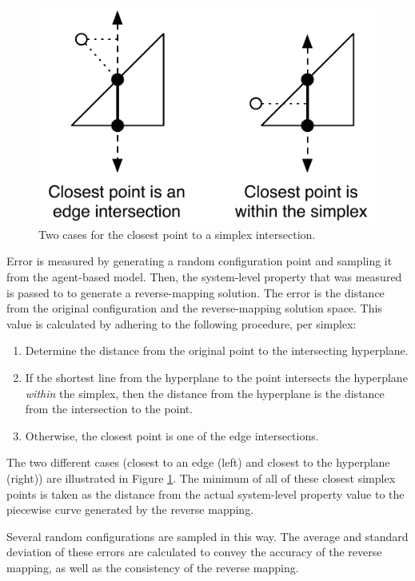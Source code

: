 \begin{figure}[ht]
\centering
\includegraphics[scale=1]{images/closest.pdf}
\caption{Two cases for the closest point to a simplex intersection.}
\label{fig:closest}
\end{figure}

Error is measured by generating a random configuration point and sampling it from the agent-based model.
Then, the system-level property that was measured is passed to \fw to generate a reverse-mapping solution.
The error is the distance from the original configuration and the reverse-mapping solution space.
This value is calculated by adhering to the following procedure, per simplex:
\begin{enumerate}
  \item Determine the distance from the original point to the intersecting hyperplane.
  \item If the shortest line from the hyperplane to the point intersects the hyperplane \textit{within} the simplex, then the distance from the hyperplane is the distance from the intersection to the point.
  \item Otherwise, the closest point is one of the edge intersections.
\end{enumerate}
The two different cases (closest to an edge (left) and closest to the hyperplane (right)) are illustrated in Figure \ref{fig:closest}.
The minimum of all of these closest simplex points is taken as the distance from the actual system-level property value to the piecewise curve generated by the reverse mapping.


Several random configurations are sampled in this way.
The average and standard deviation of these errors are calculated to convey the accuracy of the reverse mapping, as well as the consistency of the reverse mapping.

